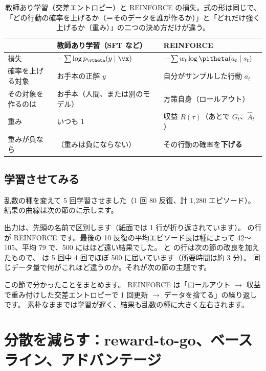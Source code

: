 \begin{table}[tbp]
\centering
\caption{教師あり学習（交差エントロピー）と REINFORCE の損失。式の形は同じで、
「どの行動の確率を上げるか（＝そのデータを誰が作るか）」と「どれだけ強く上げるか（重み）」の二つの決め方だけが違う。}
\label{tab:pg-ce-vs-pg}
\small
\begin{tabular}{lll}
\toprule
 & 教師あり学習（SFT など） & REINFORCE \\
\midrule
損失 & $-\sum\log p_{\vtheta}(y\mid\vx)$ & $-\sum w_t\log\pitheta(a_t\mid s_t)$ \\
確率を上げる対象 & お手本の正解 $y$ & 自分がサンプルした行動 $a_t$ \\
\quad その対象を作るのは & お手本（人間、または別のモデル） & 方策自身（ロールアウト） \\
重み & いつも 1 & 収益 $R(\tau)$（あとで $G_t$、$\hat{A}_t$） \\
重みが負なら & （重みは負にならない） & その行動の確率を\textbf{下げる} \\
\bottomrule
\end{tabular}
\end{table}

\subsection*{学習させてみる}

乱数の種を変えて 5 回学習させました（1 回 80 反復、計 1,280 エピソード）。結果の曲線は次の節のに示します。


出力は、先頭の名前で区別します（紙面では 1 行が折り返されています）。
 の行が REINFORCE です。最後の 10 反復の平均エピソード長は種によって 42〜105、平均 79 で、500 にはほど遠い結果でした。
 と  の行は次の節の改良を加えたもので、 は 5 回中 4 回でほぼ 500 に届いています（所要時間は約 3 分）。
同じデータ量で何がこれほど違うのか。それが次の節の主題です。

この節で分かったことをまとめます。
REINFORCE は「ロールアウト $\to$ 収益で重み付けした交差エントロピーで 1 回更新 $\to$ データを捨てる」の繰り返しです。
素朴なままでは学習が遅く、結果も乱数の種に大きく左右されます。

\section{分散を減らす：reward-to-go、ベースライン、アドバンテージ}\label{sec:pg-variance}

